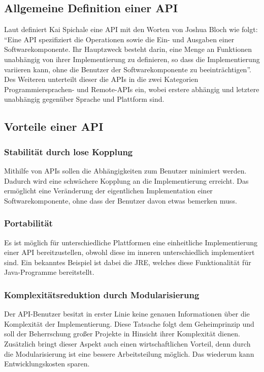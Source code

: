 \subsection{Allgemeine Definition einer API}\label{sec:defAPI}
Laut \cite[7]{apiDesign} definiert Kai Spichale eine \gls{API} mit den Worten von Joshua Bloch wie folgt: \enquote{Eine API spezifiziert die Operationen sowie die Ein- und Ausgaben einer Softwarekomponente. Ihr Hauptzweck besteht darin, eine Menge an Funktionen unabhängig von ihrer Implementierung zu definieren, so dass die Implementierung variieren kann, ohne die Benutzer der Softwarekomponente zu beeinträchtigen}. Des Weiteren unterteilt dieser die \glspl{API} in die zwei Kategorien Programmiersprachen- und Remote-\glspl{API} ein, wobei erstere abhängig und letztere unabhängig gegenüber Sprache und Plattform sind.

\subsection{Vorteile einer API}
\subsubsection{Stabilität durch lose Kopplung}
Mithilfe von \glspl{API} sollen die Abhängigkeiten zum Benutzer minimiert werden. Dadurch wird eine schwächere Kopplung an die Implementierung erreicht. Das ermöglicht eine Veränderung der eigentlichen Implementation einer Softwarekomponente, ohne dass der Benutzer davon etwas bemerken muss.

\subsubsection{Portabilität}
Es ist möglich für unterschiedliche Plattformen eine einheitliche Implementierung einer \gls{API} bereitzustellen, obwohl diese im inneren unterschiedlich implementiert sind. Ein bekanntes Beispiel ist dabei die \gls{JRE}, welches diese Funktionalität für Java-Programme bereitstellt.

\subsubsection{Komplexitätsreduktion durch Modularisierung}
Der \gls{API}-Benutzer besitzt in erster Linie keine genauen Informationen über die Komplexität der Implementierung. Diese Tatsache folgt dem Geheimprinzip und soll der Beherrschung großer Projekte in Hinsicht ihrer Komplexität dienen. Zusätzlich bringt dieser Aspekt auch einen wirtschaftlichen Vorteil, denn durch die Modularisierung ist eine bessere Arbeitsteilung möglich. Das wiederum kann Entwicklungskosten sparen.

